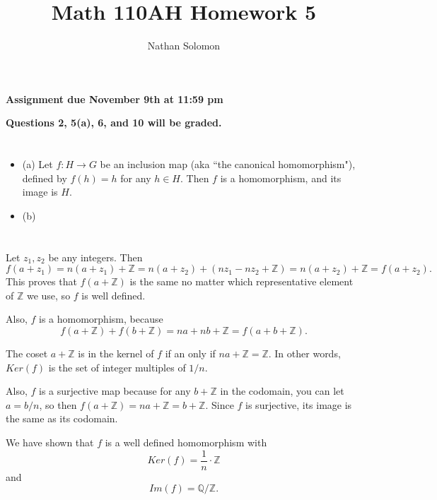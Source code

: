 \documentclass[12pt]{article}
\begin{document}
\title{Math 110AH Homework 5}
\author{Nathan Solomon}
\maketitle

\textbf{Assignment due November 9th at 11:59 pm}
\par
\textbf{Questions 2, 5(a), 6, and 10 will be graded.}

\section{}
\noindent{}\bigskip

\begin{itemize}
    \item (a) Let $f: H \rightarrow G$ be an inclusion map (aka ``the canonical homomorphism"), defined by $f(h) = h$ for any $h \in H$. Then $f$ is a homomorphism, and its image is $H$.
    \item (b)
\end{itemize}

\section{}
\noindent{}\bigskip

Let $z_1, z_2$ be any integers. Then
\[ f(a + z_1) = n(a+z_1) + \mathbb{Z} = n(a+z_2) + (nz_1-nz_2 + \mathbb{Z}) = n(a+z_2) + \mathbb{Z} = f(a+z_2). \]
This proves that $f(a+ \mathbb{Z})$ is the same no matter which representative element of $ \mathbb{Z}$ we use, so $f$ is well defined.
\par
Also, $f$ is a homomorphism, because
\[ f(a + \mathbb{Z}) + f(b + \mathbb{Z}) = na + nb + \mathbb{Z} = f(a+b + \mathbb{Z}). \]
\bigskip
\par
The coset $a + \mathbb{Z}$ is in the kernel of $f$ if an only if $na + \mathbb{Z} = \mathbb{Z}$. In other words, $Ker(f)$ is the set of integer multiples of $1/n$.
\par
Also, $f$ is a surjective map because for any $b + \mathbb{Z}$ in the codomain, you can let $a = b/n$, so then $f(a + \mathbb{Z}) = na + \mathbb{Z} = b+ \mathbb{Z}$. Since $f$ is surjective, its image is the same as its codomain.
\bigskip
\par
We have shown that $f$ is a well defined homomorphism with
\[ Ker(f) = \frac{1}{n} \cdot \mathbb{Z} \]
and
\[ Im(f) = \mathbb{Q} / \mathbb{Z}. \]
\end{document}
